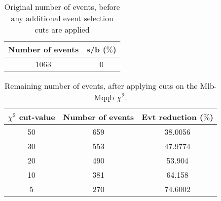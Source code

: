 \documentclass{article}
\begin{document}
 

 \begin{abstract} 
 
   The tables in this document represent the influence of the additional event selection cuts that were applied in order to reduce the number of selected events for CPU reasons. \\ 
   The considered cuts are rather basic and are merely developed to reduce the number of so-called wrong events \\ 
   \begin{itemize} 
     \item Cut on Mlb-Mqqb $\chi^{2}$ distribution 
     \item Cut on top and W-mass window 
   \end{itemize} 
 
   \textbf{Created on :} \today 
 \end{abstract} 
 
 \begin{table}[h!t] 
  \caption{Original number of events, before any additional event selection cuts are applied} 
  \centering 
   \begin{tabular}{c|c} 
     Number of events    & s/b ($\%$)     \\ 
     \hline
     1063  & 0 
 
   \end{tabular} 
 \end{table} 
 
 \begin{table}[h!t] 
  \caption{Remaining number of events, after applying cuts on the Mlb-Mqqb $\chi^{2}$.} 
  \centering 
   \begin{tabular}{c|c|c|} 
     $\chi^{2}$ cut-value    & Number of events  & Evt reduction ($\%$)    \\ 
     \hline
     50  &   659  &  38.0056 \\ 
     30  &   553  &  47.9774 \\ 
     20  &   490  &  53.904 \\ 
     10  &   381  &  64.158 \\ 
     5  &   270  &  74.6002 \\ 
   \end{tabular} 
 \end{table} 
 
\end{document}
